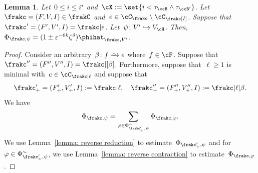 \documentclass[11pt]{amsart}
\newcommand{\eps}{\varepsilon}
\def\phi{\varphi}
\newcommand{\injection}{\hookrightarrow}
\newcommand{\bijection}{\mathchoice
	{\xrightarrow{\smash{\raisebox{-3pt}{$\scriptstyle\sim$}}}}%
	{\xrightarrow{\smash{\raisebox{-3pt}{$\scriptstyle\sim$}}}}%
	{\xrightarrow{\smash{\raisebox{-2.5pt}{$\scriptscriptstyle\sim$}}}}%
	{\xrightarrow{\smash{\raisebox{-2.5pt}{$\scriptscriptstyle\sim$}}}}%
}
\newtheorem{lemma}[algocf]{Lemma}
\theoremstyle{definition}
\numberwithin{equation}{section}
\begin{document}
	\begin{lemma}\label{lemma: reverse branching}
		Let~$0\leq i\leq i^\star$ and~$\cX:=\set{ i<\tau_{\ccB}\wedge\tau_{\ccB'} }$.
		Let~$\frakc=(F,V,I)\in\frakC$ and~$e\in\cC_\frakc\setminus\cC_\frakc[I]$.
		Suppose that~$\frakc'=(F',V',I)=\frakc|e$.
		Let~$\psi\colon V'\injection V_\cH$.
		Then,~$\Phi_{\frakc,\psi}=(1\pm \eps^{-6k}\zeta^\delta)\phihat_{\frakc,V'}$.
	\end{lemma}
	
	\begin{proof}
		Consider an arbitrary~$\beta\colon f\bijection e$ where~$f\in\cF$.
		Suppose that~$\frakc''=(F'',V'',I)=\frakc|[\beta]$.
		Furthermore, suppose that~$\ell\geq 1$ is minimal with~$e\in\cC_{\frakc|\ell}$ and suppose that
		\begin{gather*}
			\frakc'_+=(F'_+,V'_+,I):=\frakc|{\ell},\quad
			\frakc''_+=(F''_+,V''_+,I):=\frakc|\ell|\beta.
		\end{gather*}
		We have
		\begin{equation}\label{equation: reverse branching split}
			\Phi_{\frakc,\psi}
			=\sum_{\phi\in\Phi_{\frakc'_+,\psi}^\sim} \Phi_{\frakc,\phi}.
		\end{equation}
		We use Lemma~\ref{lemma: reverse reduction} to estimate~$\Phi_{\frakc'_+,\psi}$ and for~$\phi\in\Phi_{\frakc'_+,\psi}^\sim$, we use Lemma~\ref{lemma: reverse contraction} to estimate~$\Phi_{\frakc,\phi}$.
		

\end{proof}
\end{document}
